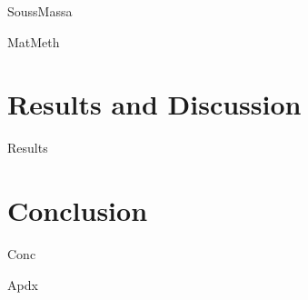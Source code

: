 \documentclass[a4paper, 12pt, bibliography=totoc, parskip=half, numbers=noenddot, twoside=true, open=right,headings=twolinechapter]{scrreprt}
\begin{document}
{SoussMassa}
\label{Chap-SouMas}


{MatMeth}

\chapter{Results and Discussion}
\label{Chap-Results}

{Results}

\chapter{Conclusion}
\label{Chap-Conc}

{Conc}

\printbibliography

\appendix
\label{Chap-Appendix}

{Apdx}
\end{document}
